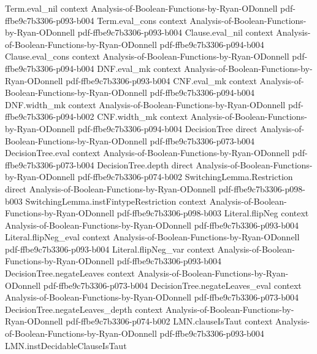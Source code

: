 \begin{lemma}
\proofstep
  {Term.eval_nil}
  {context}
  {Analysis-of-Boolean-Functions-by-Ryan-ODonnell}
  {pdf-ffbe9c7b3306-p093-b004}
\proofstep
  {Term.eval_cons}
  {context}
  {Analysis-of-Boolean-Functions-by-Ryan-ODonnell}
  {pdf-ffbe9c7b3306-p093-b004}
\proofstep
  {Clause.eval_nil}
  {context}
  {Analysis-of-Boolean-Functions-by-Ryan-ODonnell}
  {pdf-ffbe9c7b3306-p094-b004}
\proofstep
  {Clause.eval_cons}
  {context}
  {Analysis-of-Boolean-Functions-by-Ryan-ODonnell}
  {pdf-ffbe9c7b3306-p094-b004}
\proofstep
  {DNF.eval_mk}
  {context}
  {Analysis-of-Boolean-Functions-by-Ryan-ODonnell}
  {pdf-ffbe9c7b3306-p093-b004}
\proofstep
  {CNF.eval_mk}
  {context}
  {Analysis-of-Boolean-Functions-by-Ryan-ODonnell}
  {pdf-ffbe9c7b3306-p094-b004}
\proofstep
  {DNF.width_mk}
  {context}
  {Analysis-of-Boolean-Functions-by-Ryan-ODonnell}
  {pdf-ffbe9c7b3306-p094-b002}
\proofstep
  {CNF.width_mk}
  {context}
  {Analysis-of-Boolean-Functions-by-Ryan-ODonnell}
  {pdf-ffbe9c7b3306-p094-b004}
\proofstep
  {DecisionTree}
  {direct}
  {Analysis-of-Boolean-Functions-by-Ryan-ODonnell}
  {pdf-ffbe9c7b3306-p073-b004}
\proofstep
  {DecisionTree.eval}
  {context}
  {Analysis-of-Boolean-Functions-by-Ryan-ODonnell}
  {pdf-ffbe9c7b3306-p073-b004}
\proofstep
  {DecisionTree.depth}
  {direct}
  {Analysis-of-Boolean-Functions-by-Ryan-ODonnell}
  {pdf-ffbe9c7b3306-p074-b002}
\proofstep
  {SwitchingLemma.Restriction}
  {direct}
  {Analysis-of-Boolean-Functions-by-Ryan-ODonnell}
  {pdf-ffbe9c7b3306-p098-b003}
\proofstep
  {SwitchingLemma.instFintypeRestriction}
  {context}
  {Analysis-of-Boolean-Functions-by-Ryan-ODonnell}
  {pdf-ffbe9c7b3306-p098-b003}
\proofstep
  {Literal.flipNeg}
  {context}
  {Analysis-of-Boolean-Functions-by-Ryan-ODonnell}
  {pdf-ffbe9c7b3306-p093-b004}
\proofstep
  {Literal.flipNeg_eval}
  {context}
  {Analysis-of-Boolean-Functions-by-Ryan-ODonnell}
  {pdf-ffbe9c7b3306-p093-b004}
\proofstep
  {Literal.flipNeg_var}
  {context}
  {Analysis-of-Boolean-Functions-by-Ryan-ODonnell}
  {pdf-ffbe9c7b3306-p093-b004}
\proofstep
  {DecisionTree.negateLeaves}
  {context}
  {Analysis-of-Boolean-Functions-by-Ryan-ODonnell}
  {pdf-ffbe9c7b3306-p073-b004}
\proofstep
  {DecisionTree.negateLeaves_eval}
  {context}
  {Analysis-of-Boolean-Functions-by-Ryan-ODonnell}
  {pdf-ffbe9c7b3306-p073-b004}
\proofstep
  {DecisionTree.negateLeaves_depth}
  {context}
  {Analysis-of-Boolean-Functions-by-Ryan-ODonnell}
  {pdf-ffbe9c7b3306-p074-b002}
\proofstep
  {LMN.clauseIsTaut}
  {context}
  {Analysis-of-Boolean-Functions-by-Ryan-ODonnell}
  {pdf-ffbe9c7b3306-p093-b004}
\proofstep
  {LMN.instDecidableClauseIsTaut}

\end{lemma}
